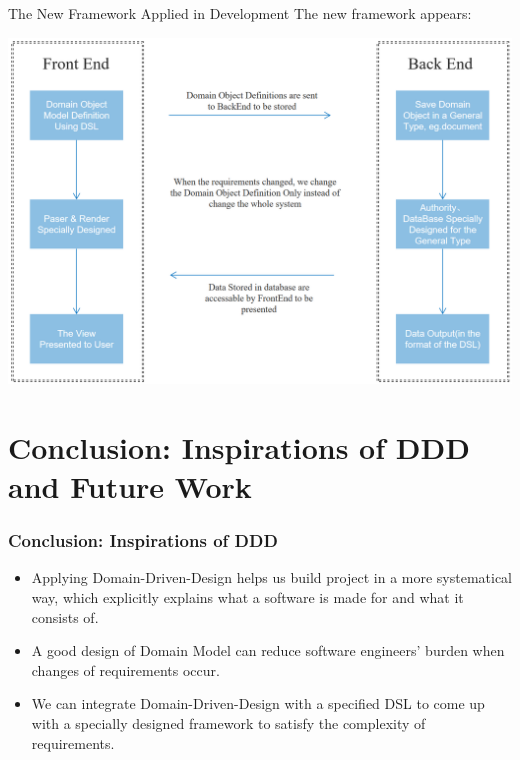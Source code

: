 \documentclass{beamer}
\begin{document}
\begin{frame}{The New Framework Applied in Development}
The new framework appears: 

\includegraphics[width=0.9\linewidth]{framework4.png}
    
\end{frame}

\section{Conclusion: Inspirations of DDD and Future Work}

\begin{frame}
\frametitle{Conclusion: Inspirations of DDD}
\begin{itemize}
    \item <1-> Applying Domain-Driven-Design helps us build project in a more systematical way, which explicitly explains what a software is made for and what it consists of.
        
    \item <2-> A good design of Domain Model can reduce software engineers' burden when changes of requirements occur.
    
    \item <3-> We can integrate Domain-Driven-Design with a specified DSL to come up with a specially designed framework to satisfy the complexity of requirements.
\end{itemize}
\end{frame}
\end{document}
